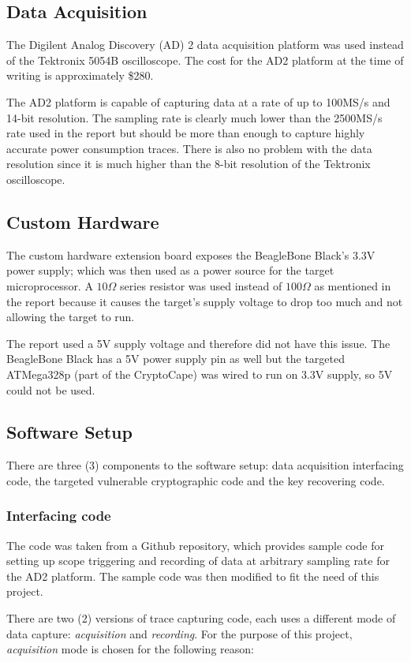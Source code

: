 \documentclass[conference]{IEEEtran}
\begin{document}
\subsection{Data Acquisition}
The Digilent Analog Discovery (AD) 2 data acquisition platform was used instead of the Tektronix 5054B oscilloscope. The cost for the AD2 platform at the time of writing is approximately \$280.

The AD2 platform is capable of capturing data at a rate of up to 100MS/s and 14-bit resolution. The sampling rate is clearly much lower than the 2500MS/s rate used in the report but should be more than enough to capture highly accurate power consumption traces. There is also no problem with the data resolution since it is much higher than the 8-bit resolution of the Tektronix oscilloscope.

\subsection{Custom Hardware}
The custom hardware extension board exposes the BeagleBone Black's 3.3V power supply; which was then used as a power source for the target microprocessor. A $10\Omega$ series resistor was used instead of $100\Omega$ as mentioned in the report because it causes the target's supply voltage to drop too much and not allowing the target to run. 

The report used a 5V supply voltage and therefore did not have this issue. The BeagleBone Black has a 5V power supply pin as well but the targeted ATMega328p (part of the CryptoCape) was wired to run on 3.3V supply, so 5V could not be used.

\subsection{Software Setup}
There are three (3) components to the software setup: data acquisition interfacing code, the targeted vulnerable cryptographic code and the key recovering code.

\subsubsection{Interfacing code}
The code was taken from a Github repository, which provides sample code for setting up scope triggering and recording of data at arbitrary sampling rate for the AD2 platform. The sample code was then modified to fit the need of this project.

There are two (2) versions of trace capturing code, each uses a different mode of data capture: \textit{acquisition} and \textit{recording}. For the purpose of this project, \textit{acquisition} mode is chosen for the following reason:
\end{document}
